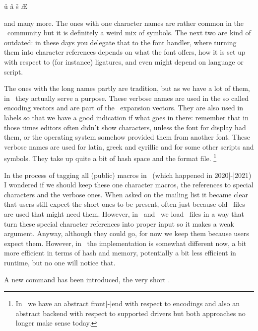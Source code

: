 \starttyping[option=TEX]
\"u \^a \v{s} \AE \ij \eacute \oslash
\stoptyping

and many more. The ones with one character names are rather common in the \TEX\
community but it is definitely a weird mix of symbols. The next two are kind of
outdated: in these days you delegate that to the font handler, where turning them
into \quote {single} character references depends on what the font offers, how it
is set up with respect to (for instance) ligatures, and even might depend on
language or script.

The ones with the long names partly are tradition, but as we have a lot of them,
in \MKII\ they actually serve a purpose. These verbose names are used in the so
called encoding vectors and are part of the \UTF\ expansion vectors. They are
also used in labels so that we have a good indication if what goes in there:
remember that in those times editors often didn't show characters, unless the
font for display had them, or the operating system somehow provided them from
another font. These verbose names are used for latin, greek and cyrillic and for
some other scripts and symbols. They take up quite a bit of hash space and the
format file. \footnote {In \MKII\ we have an abstract front|-|end with respect to
encodings and also an abstract backend with respect to supported drivers but both
approaches no longer make sense today.}

\stopsectionlevel

\startsectionlevel[title=The \LMTX\ approach]

In the process of tagging all (public) macros in \LMTX\ (which happened in
2020|-|2021) I wondered if we should keep these one character macros, the
references to special characters and the verbose ones. When asked on the mailing
list it became clear that users still expect the short ones to be present, often
just because old \BIBTEX\ files are used that might need them. However, in \MKIV\
and \LMTX\ we load \BIBTEX\ files in a way that turn these special character
references into proper \UTF8 input so it makes a weak argument. Anyway, although
they could go, for now we keep them because users expect them. However, in \LMTX\
the implementation is somewhat different now, a bit more efficient in terms of
hash and memory, potentially a bit less efficient in runtime, but no one will
notice that.

A new command has been introduced, the very short \type {\chr}.

\startbuffer
\chr {à} \chr {á} \chr {ä}
  
  
\chr {aacute}  \chr {agrave}  
\stopbuffer

